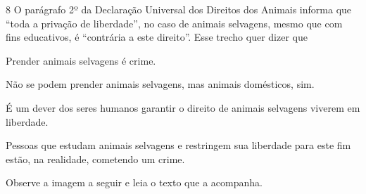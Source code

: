 
\num{8} O parágrafo 2º da Declaração Universal dos Direitos dos Animais
informa que ``toda a privação de liberdade'', no caso de animais selvagens,
mesmo que com fins educativos, é ``contrária a este direito''. Esse trecho
quer dizer que

\begin{escolha}
\item Prender animais selvagens é crime.
\item Não se podem prender animais selvagens, mas animais domésticos, sim.
\item É um dever dos seres humanos garantir o direito de animais selvagens
viverem em liberdade. 
\item Pessoas que estudam animais selvagens e restringem sua liberdade para
este fim estão, na realidade, cometendo um crime.
\end{escolha}



Observe a imagem a seguir e leia o texto que a acompanha.

